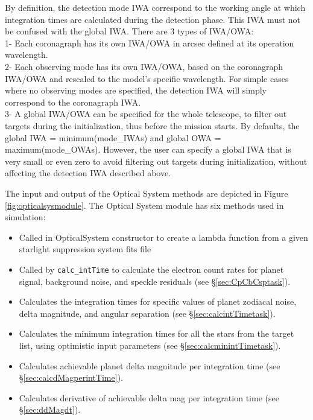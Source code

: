 \documentclass[cleanfoot]{asme2ej}
\newcommand{\reffig}[1]{Figure \ref{#1}}
\begin{document}
By definition, the detection mode IWA correspond to the working angle at which integration times are calculated during the detection phase. This IWA must not be confused with the global IWA. There are 3 types of IWA/OWA:\\
1- Each coronagraph has its own IWA/OWA in arcsec defined at its operation wavelength.\\
2- Each observing mode has its own IWA/OWA, based on the coronagraph IWA/OWA and rescaled to the model's specific wavelength. For simple cases where no observing modes are specified, the detection IWA will simply correspond to the coronagraph IWA.\\
3- A global IWA/OWA can be specified for the whole telescope, to filter out targets during the initialization, thus before the mission starts. By defaults, the global IWA = minimum(mode\_IWAs) and global OWA = maximum(mode\_OWAs). However, the user can specify a global IWA that is very small or even zero to avoid filtering out targets during initialization, without affecting the detection IWA described above.

The input and output of the Optical System methods are depicted in \reffig{fig:opticalsysmodule}. The Optical System module has six methods used in simulation:
\begin{itemize}[leftmargin=2in,font={\ttfamily}]
    \item[\texttt get\_coro\_param] Called in OpticalSystem constructor to create a lambda function from a given starlight suppression system fits file
    \item[\texttt Cp\_Cb\_Csp] Called by \verb+calc_intTime+ to calculate the electron count rates for planet signal, background noise, and speckle residuals (see \S\ref{sec:CpCbCsptask}).
    \item[\texttt calc\_intTime] Calculates the integration times for specific values of planet zodiacal noise, delta magnitude, and angular separation (see \S\ref{sec:calcintTimetask}).
    \item[\texttt calc\_minintTime] Calculates the minimum integration times for all the stars from the target list, using optimistic input parameters  (see \S\ref{sec:calcminintTimetask}).
    \item[\texttt calc\_dMag\_per\_intTime] Calculates achievable planet delta magnitude per integration time (see \S\ref{sec:calcdMagperintTime}).
    \item[\texttt ddMag\_dt] Calculates derivative of achievable delta mag per integration time (see \S\ref{sec:ddMagdt}).
\end{itemize}
\end{document}
